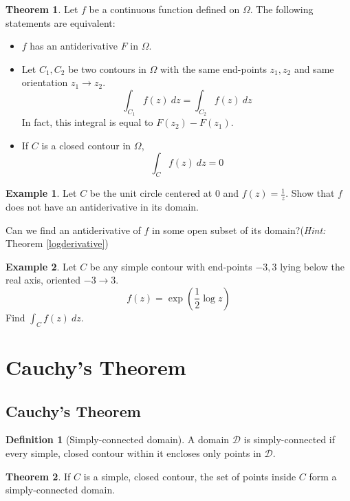 \documentclass[10pt, a4paper]{extarticle}
\theoremstyle{definition}
\newtheorem{thm}{Theorem}
\newtheorem{defn}{Definition}
\newtheorem{eg}{Example}
\begin{document}
	\begin{thm}\label{conservative}
		Let $f$ be a continuous function defined on $\Omega$. The following statements are equivalent:
		\begin{itemize}
			\item $f$ has an antiderivative $F$ in $\Omega$.
			\item Let $C_1,C_2$ be two contours in $\Omega$ with the same end-points $z_1,z_2$ and same orientation $z_1\to z_2$.
				\[\int_{C_1}f(z)\ dz=\int_{C_2}f(z)\ dz\]
				In fact, this integral is equal to $F(z_2)-F(z_1)$.
			\item If $C$ is a closed contour in $\Omega$,
				\[\int_Cf(z)\ dz=0\]
		\end{itemize}
	\end{thm}
	\begin{eg}
		Let $C$ be the unit circle centered at 0 and $f(z)=\frac{1}{z}$. Show that $f$ does not have an antiderivative in its domain.

		Can we find an antiderivative of $f$ in some open subset of its domain?(\textit{Hint: }Theorem \ref{logderivative})
	\end{eg}
	\begin{eg}
		Let $C$ be any simple contour with end-points $-3,3$ lying below the real axis, oriented $-3\to 3$.
		\[f(z)=\exp(\frac{1}{2}\log z)\tag*{($0<\arg z<2\pi$)}\]
		Find $\int_C f(z)\ dz$.
	\end{eg}

	\section{Cauchy's Theorem}
	\subsection{Cauchy's Theorem}
	\begin{defn}[Simply-connected domain]
		A domain $\mathscr{D}$ is simply-connected if every simple, closed contour within it encloses only points in $\mathscr{D}$.
	\end{defn}

	\begin{thm}
		If $C$ is a simple, closed contour, the set of points inside $C$ form a simply-connected domain.
	\end{thm}
\end{document}
